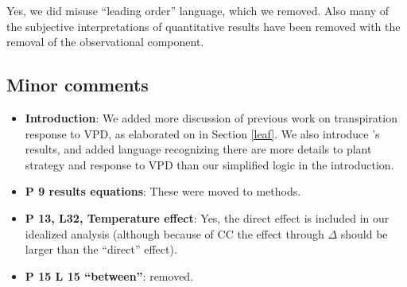 \documentclass[12pt]{article}
\begin{document}
Yes, we did misuse ``leading order'' language, which we removed. Also many
of the subjective interpretations of quantitative results have been
removed with the removal of the observational component.

\subsection{Minor comments}

\begin{itemize}
  \item \textbf{Introduction}: We added more discussion of previous
    work on transpiration response to VPD, as elaborated on in Section
    \ref{leaf}. We also introduce \cite{Novick_2016}'s results, and
    added language recognizing there are more details to plant strategy
    and response to VPD than our simplified logic in the introduction.
  \item \textbf{P 9 results equations}: These were moved to methods.
  \item \textbf{P 13, L32, Temperature effect}: Yes, the direct effect is
    included in our idealized analysis (although because of CC the
    effect through $\Delta$ should be larger than the ``direct''
    effect).
  \item \textbf{P 15 L 15 ``between''}: removed.
\end{itemize}


\end{document}
